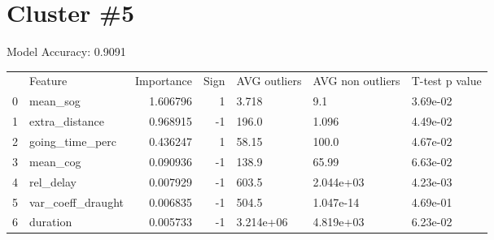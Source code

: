 \section*{Cluster \#5}
Model Accuracy: 0.9091


\begin{tabular}{llrrlll}
 & Feature & Importance & Sign & AVG outliers & AVG non outliers & T-test p value \\
0 & mean\_sog & 1.606796 & 1 & 3.718 & 9.1 & 3.69e-02 \\
1 & extra\_distance & 0.968915 & -1 & 196.0 & 1.096 & 4.49e-02 \\
2 & going\_time\_perc & 0.436247 & 1 & 58.15 & 100.0 & 4.67e-02 \\
3 & mean\_cog & 0.090936 & -1 & 138.9 & 65.99 & 6.63e-02 \\
4 & rel\_delay & 0.007929 & -1 & 603.5 & 2.044e+03 & 4.23e-03 \\
5 & var\_coeff\_draught & 0.006835 & -1 & 504.5 & 1.047e-14 & 4.69e-01 \\
6 & duration & 0.005733 & -1 & 3.214e+06 & 4.819e+03 & 6.23e-02 \\
\end{tabular}
